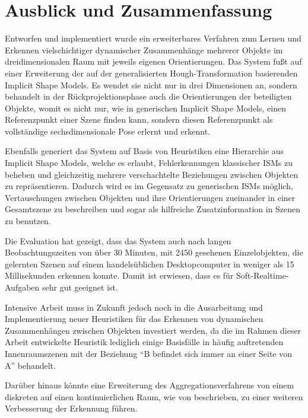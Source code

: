 \chapter{Ausblick und Zusammenfassung}

Entworfen und implementiert wurde ein erweiterbares Verfahren zum Lernen und Erkennen vielschichtiger dynamischer Zusammenhänge mehrerer Objekte im dreidimensionalen Raum mit jeweils eigenen Orientierungen.
Das System fußt auf einer Erweiterung der auf der generalisierten Hough-Transformation basierenden Implicit Shape Models. 
Es wendet sie nicht nur in drei Dimensionen an, sondern behandelt in der Rückprojektionsphase auch die Orientierungen der beteiligten Objekte, womit es nicht nur, wie in generischen Implicit Shape Models, einen Referenzpunkt einer Szene finden kann, sondern diesen Referenzpunkt als vollständige sechsdimensionale Pose erlernt und erkennt.

Ebenfalls generiert das System auf Basis von Heuristiken eine Hierarchie aus Implicit Shape Models, welche es erlaubt, Fehlerkennungen klassischer ISMs zu beheben und gleichzeitig mehrere verschachtelte Beziehungen zwischen Objekten zu repräsentieren.
Dadurch wird es im Gegensatz zu generischen ISMs möglich, Vertauschungen zwischen Objekten und ihre Orientierungen zueinander in einer Gesamtszene zu beschreiben und sogar als hilfreiche Zusatzinformation in Szenen zu benutzen.

Die Evaluation hat gezeigt, dass das System auch nach langen Beobachtungszeiten von über 30 Minuten, mit 2450 gesehenen Einzelobjekten, die gelernten Szenen auf einem handelsüblichen Desktopcomputer in weniger als 15 Millisekunden erkennen konnte.
Damit ist erwiesen, dass es für Soft-Realtime-Aufgaben sehr gut geeignet ist.

Intensive Arbeit muss in Zukunft jedoch noch in die Ausarbeitung und Implementierung neuer Heuristiken für das Erkennen von dynamischen Zusammenhängen zwischen Objekten investiert werden, da die im Rahmen dieser Arbeit entwickelte Heuristik lediglich einige Basisfälle in häufig auftretenden Innenraumszenen mit der Beziehung "`B befindet sich immer an einer Seite von A"' behandelt.

Darüber hinaus könnte eine Erweiterung des Aggregationsverfahrens von einem diskreten auf einen kontinuierlichen Raum, wie von \citeauthor{Leibe04combinedobject} beschrieben, zu einer weiteren Verbesserung der Erkennung führen.

